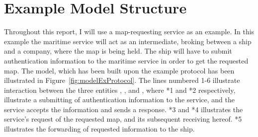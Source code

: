 \section{Example Model Structure}
Throughout this report, I will use a map-requesting service as an example. In this example the maritime service will act as an intermediate, broking between a ship and a company, where the map is being held. The ship will have to submit authentication information to the maritime service in order to get the requested map. The model, which has been built upon the example protocol has been illustrated in Figure~\ref{fig:modelExProtocol}. The lines numbered 1-6 illustrate interaction between the three entities , , and , where *1 and *2 respectively, illustrate a submitting of authentication information to the service, and the service accepts the information and sends a response. *3 and *4 illustrates the service's request of the requested map, and its subsequent receiving hereof. *5 illustrates the forwarding of requested information to the ship.


